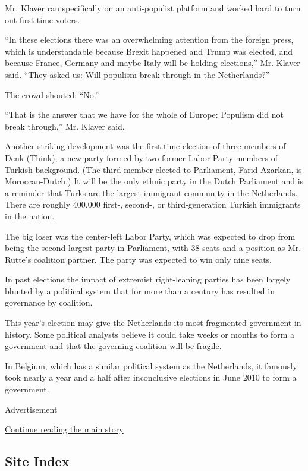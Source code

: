 Mr. Klaver ran specifically on an anti-populist platform and worked hard
to turn out first-time voters.

``In these elections there was an overwhelming attention from the
foreign press, which is understandable because Brexit happened and Trump
was elected, and because France, Germany and maybe Italy will be holding
elections,'' Mr. Klaver said. ``They asked us: Will populism break
through in the Netherlands?''

The crowd shouted: ``No.''

``That is the answer that we have for the whole of Europe: Populism did
not break through,'' Mr. Klaver said.

Another striking development was the first-time election of three
members of Denk (Think), a new party formed by two former Labor Party
members of Turkish background. (The third member elected to Parliament,
Farid Azarkan, is Moroccan-Dutch.) It will be the only ethnic party in
the Dutch Parliament and is a reminder that Turks are the largest
immigrant community in the Netherlands. There are roughly 400,000
first-, second-, or third-generation Turkish immigrants in the nation.

The big loser was the center-left Labor Party, which was expected to
drop from being the second largest party in Parliament, with 38 seats
and a position as Mr. Rutte's coalition partner. The party was expected
to win only nine seats.

In past elections the impact of extremist right-leaning parties has been
largely blunted by a political system that for more than a century has
resulted in governance by coalition.

This year's election may give the Netherlands its most fragmented
government in history. Some political analysts believe it could take
weeks or months to form a government and that the governing coalition
will be fragile.

In Belgium, which has a similar political system as the Netherlands, it
famously took nearly a year and a half after inconclusive elections in
June 2010 to form a government.

Advertisement

\protect\hyperlink{after-bottom}{Continue reading the main story}

\hypertarget{site-index}{%
\subsection{Site Index}\label{site-index}}

